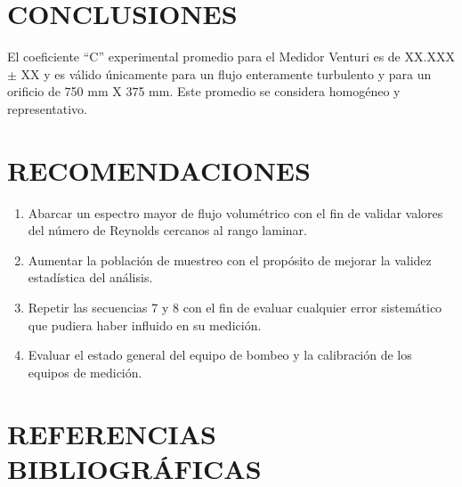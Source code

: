 \documentclass[11pt, letterpaper]{article}
\begin{document}
\section{CONCLUSIONES}

El coeficiente “C” experimental promedio para el Medidor Venturi es de XX.XXX $\pm$ XX y es válido únicamente para un flujo enteramente turbulento y para un orificio de 750 mm X 375 mm. Este promedio se considera homogéneo y representativo.

\section{RECOMENDACIONES}

\begin{enumerate}
\item Abarcar un espectro mayor de flujo volumétrico con el fin de validar valores del número de Reynolds cercanos al rango laminar.
\item Aumentar la población de muestreo con el propósito de mejorar la validez estadística del análisis.
\item Repetir las secuencias 7 y 8 con el fin de evaluar cualquier error sistemático que pudiera haber influido en su medición.
\item Evaluar el estado general del equipo de bombeo y la calibración de los equipos de medición.
\end{enumerate}

\pagebreak

\section{REFERENCIAS BIBLIOGRÁFICAS}

\printbibliography

\pagebreak

\end{document}
